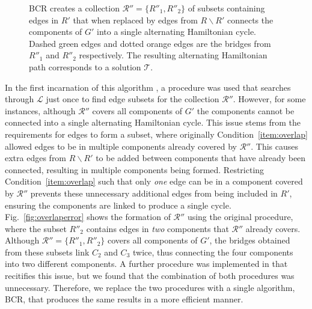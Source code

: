 \documentclass[a4paper,11pt,authoryear]{elsarticle}
\begin{document}
\begin{figure}[h]	
	\centering
	\begin{subfigure}[h]{0.35\textwidth}
		
		\caption{}
		\label{fig:bcrlist}
	\end{subfigure} \hspace{7mm} %
	\begin{subfigure}[h]{0.25\textwidth}
		
		\caption{}
		\label{fig:mpsconnect}
	\end{subfigure} \hspace{7mm} %
	\begin{subfigure}[h]{0.25\textwidth}
		
		\caption{}
		\label{fig:mpscycle}
	\end{subfigure}
	\begin{subfigure}[h]{0.75\textwidth}
		
		\caption{}
		\label{fig:solutionpath}
	\end{subfigure}
	\caption{BCR creates a collection $\mathcal{R}'' = \{R''_1, R''_2\}$ of subsets containing edges in $R'$ that when replaced by edges from $R\backslash R'$ connects the components of $G'$ into a single alternating Hamiltonian cycle. Dashed green edges and dotted orange edges are the bridges from $R''_1$ and $R''_2$ respectively. The resulting alternating Hamiltonian path corresponds to a solution $\mathcal{T}$.}
	\label{fig:bcr}
\end{figure}

\noindent In the first incarnation of this algorithm \cite{becker2010}, a procedure was used that searches through $\mathcal{L}$ just once to find edge subsets for the collection $\mathcal{R}''$. However, for some instances, although $\mathcal{R}''$ covers all components of $G'$ the components cannot be connected into a single alternating Hamiltonian cycle. This issue stems from the requirements for edges to form a subset, where originally Condition~\ref{item:overlap} allowed edges to be in multiple components already covered by $\mathcal{R}''$. This causes extra edges from $R \backslash R'$ to be added between components that have already been connected, resulting in multiple components being formed. Restricting Condition~\ref{item:overlap} such that only \emph{one} edge can be in a component covered by $\mathcal{R}''$ prevents these unnecessary additional edges from being included in $R'$, ensuring the components are linked to produce a single cycle. Fig.~\ref{fig:overlaperror} shows the formation of $\mathcal{R}''$ using the original procedure, where the subset $R''_2$ contains edges in \emph{two} components that $\mathcal{R}''$ already covers. Although $\mathcal{R}'' = \{R''_1, R''_2\}$ covers all components of $G'$, the bridges obtained from these subsets link $C_2$ and $C_3$ twice, thus connecting the four components into two different components. A further procedure was implemented in \cite{hawa2018} that recitifies this issue, but we found that the combination of both procedures was unnecessary. Therefore, we replace the two procedures with a single algorithm, BCR, that produces the same results in a more efficient manner.
\end{document}
